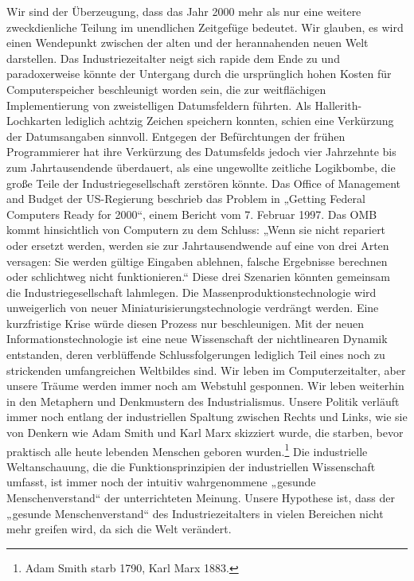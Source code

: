 \documentclass[
  a5paper,
  smalldemyvopaper,10pt,twoside,onecolumn,openright,extrafontsizes,hidelinks]{memoir}
\begin{document}
Wir sind der Überzeugung, dass das Jahr 2000 mehr als nur eine weitere
zweckdienliche Teilung im unendlichen Zeitgefüge bedeutet. Wir glauben,
es wird einen Wendepunkt zwischen der alten und der herannahenden neuen
Welt darstellen. Das Industriezeitalter neigt sich rapide dem Ende zu
und paradoxerweise könnte der Untergang durch die ursprünglich hohen
Kosten für Computerspeicher beschleunigt worden sein, die zur
weitflächigen Implementierung von zweistelligen Datumsfeldern führten.
Als Hallerith-Lochkarten lediglich achtzig Zeichen speichern konnten,
schien eine Verkürzung der Datumsangaben sinnvoll. Entgegen der
Befürchtungen der frühen Programmierer hat ihre Verkürzung des
Datumsfelds jedoch vier Jahrzehnte bis zum Jahrtausendende überdauert,
als eine ungewollte zeitliche Logikbombe, die große Teile der
Industriegesellschaft zerstören könnte. Das Office of Management and
Budget der US-Regierung beschrieb das Problem in „Getting Federal
Computers Ready for 2000``, einem Bericht vom 7. Februar 1997. Das OMB
kommt hinsichtlich von Computern zu dem Schluss: „Wenn sie nicht
repariert oder ersetzt werden, werden sie zur Jahrtausendwende auf eine
von drei Arten versagen: Sie werden gültige Eingaben ablehnen, falsche
Ergebnisse berechnen oder schlichtweg nicht funktionieren.`` Diese drei
Szenarien könnten gemeinsam die Industriegesellschaft lahmlegen. Die
Massenproduktionstechnologie wird unweigerlich von neuer
Miniaturisierungstechnologie verdrängt werden. Eine kurzfristige Krise
würde diesen Prozess nur beschleunigen. Mit der neuen
Informationstechnologie ist eine neue Wissenschaft der nichtlinearen
Dynamik entstanden, deren verblüffende Schlussfolgerungen lediglich Teil
eines noch zu strickenden umfangreichen Weltbildes sind. Wir leben im
Computerzeitalter, aber unsere Träume werden immer noch am Webstuhl
gesponnen. Wir leben weiterhin in den Metaphern und Denkmustern des
Industrialismus. Unsere Politik verläuft immer noch entlang der
industriellen Spaltung zwischen Rechts und Links, wie sie von Denkern
wie Adam Smith und Karl Marx skizziert wurde, die starben, bevor
praktisch alle heute lebenden Menschen geboren wurden.\footnote{Adam
  Smith starb 1790, Karl Marx 1883.} Die industrielle Weltanschauung,
die die Funktionsprinzipien der industriellen Wissenschaft umfasst, ist
immer noch der intuitiv wahrgenommene „gesunde Menschenverstand`` der
unterrichteten Meinung. Unsere Hypothese ist, dass der „gesunde
Menschenverstand`` des Industriezeitalters in vielen Bereichen nicht
mehr greifen wird, da sich die Welt verändert.
\end{document}
